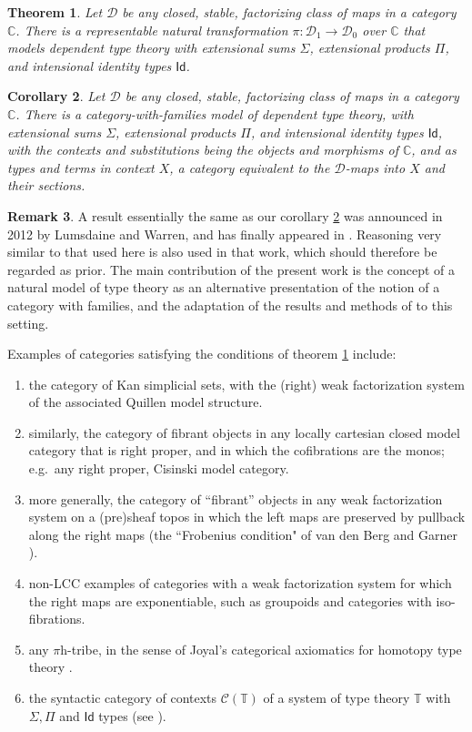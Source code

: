 \documentclass[12pt]{article}
\newcommand{\C}{\ensuremath{\mathbb{C}}}
\newcommand{\D}{\ensuremath{\mathcal{D}}}
\newcommand{\Id}{\mathsf{Id}}
\newtheorem{theorem}{Theorem}
\newtheorem{corollary}[theorem]{Corollary}
\theoremstyle{definition}
\newtheorem{remark}[theorem]{Remark}
\begin{document}
\begin{theorem}\label{thm:natmod}
Let  $\D$ be any closed,  stable, factorizing class of maps in a category \C.  There is  a representable natural transformation $\pi:\D_1\to\D_0$ over $\C$ that models dependent type theory with extensional sums $\Sigma$, extensional products $\Pi$, and intensional identity types $\Id$.
\end{theorem}

\begin{corollary}\label{cor:CwF}
Let  $\D$ be any closed,  stable, factorizing class of maps in a category \C.  There is a category-with-families model of dependent type theory, with extensional sums $\Sigma$, extensional products $\Pi$, and intensional identity types $\Id$, with the contexts and substitutions being the objects and morphisms of \C, and as types and terms in context $X$, a category equivalent to the \D-maps into $X$ and their sections.
\end{corollary}

\begin{remark}\label{rem:credit}
A result essentially the same as our corollary \ref{cor:CwF} was announced in 2012 by Lumsdaine and Warren, and has finally appeared in \cite{LW}.  Reasoning very similar to that used here is also used in that work, which should therefore be regarded as prior.  The main contribution of the present work is the concept of a natural model of type theory as an alternative presentation of the notion of a category with families, and the adaptation of the results and methods of \cite{LW} to this setting.
\end{remark}

\noindent Examples of categories satisfying the conditions of  theorem \ref{thm:natmod} include:
\begin{enumerate}
\item the category of Kan simplicial sets, with the (right) weak factorization system of the associated Quillen model structure.
\item similarly, the category of fibrant objects in any locally cartesian closed model category that is right proper, and in which the cofibrations are the monos; e.g.\ any right proper, Cisinski model category.
\item more generally, the category of ``fibrant'' objects in any weak factorization system on a (pre)sheaf topos in which the left maps are preserved by pullback along the right maps (the ``Frobenius condition" of van den Berg and Garner \cite{GvdB}).
\item non-LCC examples of categories with a weak factorization system for which the right maps are exponentiable, such as groupoids and categories with iso-fibrations.
\item any $\pi$h-tribe, in the sense of Joyal's categorical axiomatics for homotopy type theory \cite{J}.
\item the syntactic category of contexts $\mathcal{C}(\mathbb{T})$ of a system of type theory $\mathbb{T}$ with $\Sigma, \Pi$ and $\Id$ types (see \cite{GG}).
\end{enumerate}
\end{document}

